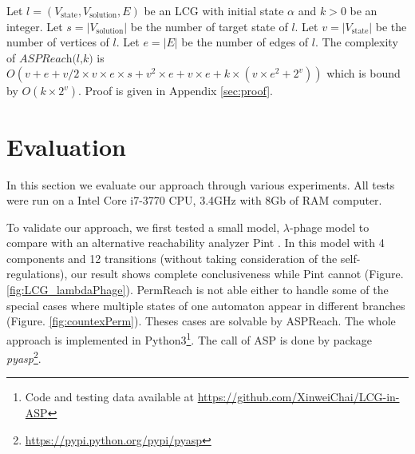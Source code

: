 \documentclass{entcs}
\begin{document}
\begin{theorem}
    Let $l=(V_{\mathrm{state}}, V_{\mathrm{solution}}, E)$ be an LCG with initial state $\alpha$ and $k > 0$ be an integer.
    Let $s=|V_{\mathrm{solution}}|$ be the number of target state of $l$.
    Let $v = |V_{\mathrm{state}}|$ be the number of vertices of $l$.
    Let $e=|E|$ be the number of edges of $l$.
    The complexity of $\textit{ASPReach(l,k)}$ is $O(v + e + v/2 \times v \times e \times s + v^{2} \times e + v \times e + k \times (v \times e^{2} + 2^{v}))$ which is bound by $O(k \times 2^{v})$.
    Proof is given in Appendix \ref{sec:proof}.
\end{theorem}


\section{Evaluation}
In this section we evaluate our approach through various experiments.
All tests were run on a Intel Core i7-3770 CPU, \@3.4GHz with 8Gb of RAM computer.

To validate our approach, we first tested a small model, $\lambda$-phage model \cite{thieffry1995dynamical} to compare with an alternative reachability analyzer Pint \cite{pauleve2012}.
In this model with 4 components and 12 transitions (without taking consideration of the self-regulations),
our result shows complete conclusiveness while Pint cannot (Figure. \ref{fig:LCG_lambdaPhage}). %
PermReach \cite{chai2018heuristic} is not able either to handle some of the special cases where multiple states of one automaton appear in different branches (Figure. \ref{fig:countexPerm}).
Theses cases are solvable by ASPReach.
The whole approach is implemented in Python3\footnote{Code and testing data available at \url{https://github.com/XinweiChai/LCG-in-ASP}}.
The call of ASP is done by package \textit{pyasp}\footnote{\url{https://pypi.python.org/pypi/pyasp}}. 
\end{document}
